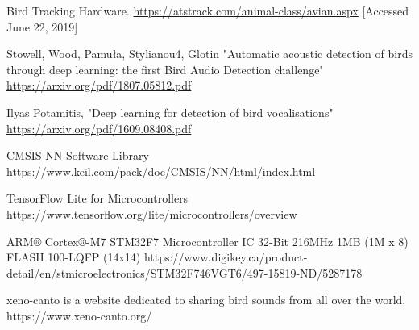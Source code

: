 \documentclass[12pt,journal,compsoc]{IEEEtran}
\begin{document}
\begin{thebibliography}{1}

Bird Tracking Hardware.
\url{https://atstrack.com/animal-class/avian.aspx} [Accessed June 22, 2019]

Stowell, Wood, Pamuła, Stylianou4, Glotin "Automatic acoustic detection of birds through deep learning: the first Bird Audio Detection challenge"
\url{https://arxiv.org/pdf/1807.05812.pdf}

Ilyas Potamitis, "Deep learning for detection of bird vocalisations"
\url{https://arxiv.org/pdf/1609.08408.pdf}

CMSIS NN Software Library
https://www.keil.com/pack/doc/CMSIS/NN/html/index.html

TensorFlow Lite for Microcontrollers
https://www.tensorflow.org/lite/microcontrollers/overview

ARM® Cortex®-M7 STM32F7 Microcontroller IC 32-Bit 216MHz 1MB (1M x 8) FLASH 100-LQFP (14x14)
https://www.digikey.ca/product-detail/en/stmicroelectronics/STM32F746VGT6/497-15819-ND/5287178

xeno-canto is a website dedicated to sharing bird sounds from all over the world.
https://www.xeno-canto.org/
\end{thebibliography}
\end{document}
